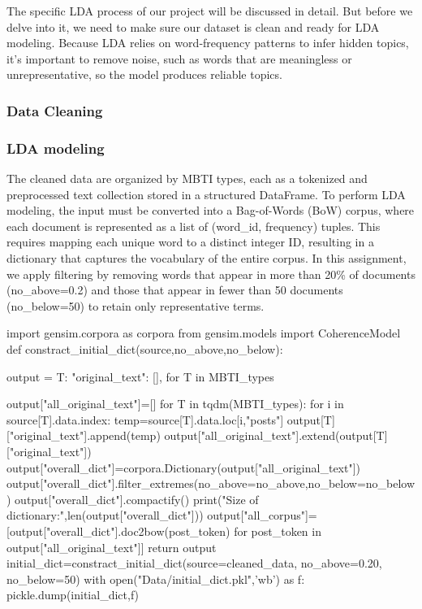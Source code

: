 \documentclass[12pt]{article}
\begin{document}
	The specific LDA process of our project will be discussed in detail. But before we delve into it, we need to make sure our dataset is clean and ready for LDA modeling. Because LDA relies on word‐frequency patterns to infer hidden topics, it’s important to remove noise, such as words that are meaningless or unrepresentative, so the model produces reliable topics.
	\subsubsection{Data Cleaning}
	\subsubsection{LDA modeling}
	The cleaned data are organized by MBTI types, each as a tokenized and preprocessed text collection stored in a structured DataFrame. To perform LDA modeling, the input must be converted into a Bag-of-Words (BoW) corpus, where each document is represented as a list of (word\_id, frequency) tuples. This requires mapping each unique word to a distinct integer ID, resulting in a dictionary that captures the vocabulary of the entire corpus. In this assignment, we apply filtering by removing words that appear in more than 20\% of documents (no\_above=0.2) and those that appear in fewer than 50 documents (no\_below=50) to retain only representative terms.
	\begin{python}
import gensim.corpora as corpora
from gensim.models import CoherenceModel
def constract_initial_dict(source,no_above,no_below):

    output = {T: {
        "original_text": [],
    } for T in MBTI_types}
    
    output["all_original_text"]=[]
    for T in tqdm(MBTI_types):
        for i in source[T].data.index:
            temp=source[T].data.loc[i,"posts"]
            output[T]["original_text"].append(temp)
        output["all_original_text"].extend(output[T]["original_text"])
    output["overall_dict"]=corpora.Dictionary(output["all_original_text"])
    output["overall_dict"].filter_extremes(no_above=no_above,no_below=no_below)
    output["overall_dict"].compactify()
    print("Size of dictionary:",len(output["overall_dict"]))
    output["all_corpus"]=[output["overall_dict"].doc2bow(post_token) for post_token in output["all_original_text"]]
    return output
initial_dict=constract_initial_dict(source=cleaned_data,
                                    no_above=0.20,
                                    no_below=50)
with open("Data/initial_dict.pkl",'wb') as f:
    pickle.dump(initial_dict,f)
	\end{python}
	
\end{document}
